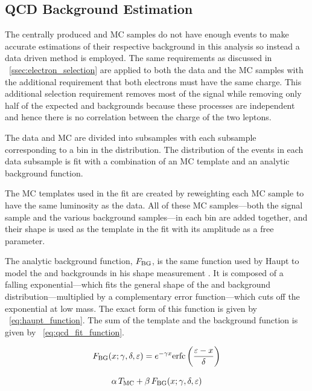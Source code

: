 \subsection{QCD Background Estimation}
\label{ssec:qcd_background}

The centrally produced \QCDjets and \wjets MC samples do not have enough events
to make accurate estimations of their respective background in this analysis so
instead a data driven method is employed. The same requirements as discussed in
\SEC~\ref{ssec:electron_selection} are applied to both the data and the MC
samples with the additional requirement that both electrons must have the same
charge. This additional selection requirement removes most of the signal while
removing only half of the expected \QCDjets and \wjets backgrounds because
these processes are independent and hence there is no correlation between the
charge of the two leptons.

The data and MC are divided into subsamples with each subsample corresponding
to a bin in the \phistar distribution. The \mee distribution of the events in
each data subsample is fit with a combination of an MC template and an analytic
background function.

The MC templates used in the fit are created by reweighting each MC sample to
have the same luminosity as the data. All of these MC samples---both the
\MADGRAPH signal sample and the various background samples---in each \phistar
bin are added together, and their shape is used as the template in the fit with
its amplitude as a free parameter.

The analytic background function, $F_{\text{BG}}$, is the same function used by
Haupt to model the \QCDjets and \wjets backgrounds in his \Ztoee shape
measurement \cite{haupt_2011}. It is composed of a falling exponential---which
fits the general shape of the \QCDjets and \wjets background
distribution---multiplied by a complementary error function---which cuts off
the exponential at low mass. The exact form of this function is given by
\EQ~\ref{eq:haupt_function}. The sum of the template and the background
function is given by \EQ~\ref{eq:qcd_fit_function}.

\begin{equation}\label{eq:haupt_function}
    F_{\text{BG}}(x; \gamma, \delta, \varepsilon) = e^{- \gamma x} {\mathrm{erfc}} \left( \frac{\varepsilon - x}{\delta} \right)
\end{equation}

\begin{equation}\label{eq:qcd_fit_function}
    \alpha \, T_{\text{MC}} + \beta \, F_{\text{BG}}(x; \gamma, \delta, \varepsilon)
\end{equation}

